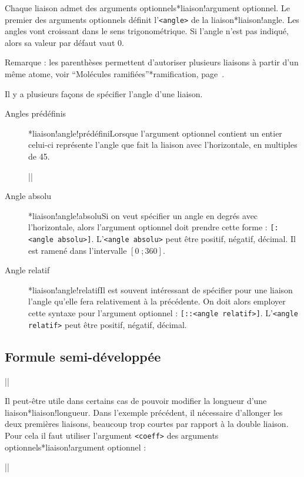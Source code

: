 \documentclass[10pt]{article}
\makeatletter
\newcommand\idx{\@ifstar{\let\print@or@not\@gobble\idx@}{\let\print@or@not\@firstofone\idx@}}
\newcommand\idx@[1]{%
	\ifcat\expandafter\noexpand\@car#1\@nil\relax%
		\expandafter\ifx\@car#1\@nil\protect
			\index{#1}%
			\print@or@not{#1}%
		\else
			\saveexpandmode\expandarg
			\StrSubstitute{\string#1}{\string @}{\@empty\protect\symbol{'100}}[\temp@]%
			\StrGobbleLeft\temp@1[\temp@]%
			\restoreexpandmode
			\expandafter\index\expandafter{\temp@ @\protect\texttt{\protect\textbackslash\temp@}}%
			\print@or@not{\texttt{\string#1}}%
		\fi
	\else
		\index{#1}%
		\print@or@not{#1}%
	\fi
}
\newcommand\make@car@active[2]{%
	\catcode`#1\active
	\begingroup
		\lccode`\~`#1\relax
		\lowercase{\endgroup\def~{#2}}%
}
\newif\if@exstar
\newcommand\exemple{%
	\begingroup
	\parskip\z@
	\@makeother\;\@makeother\!\@makeother\?\@makeother\:%
	\@ifstar{\@exstartrue\exemple@}{\@exstarfalse\exemple@}}
\newcommand\exemple@[2][65]{%
	\medbreak\noindent
	\begingroup
		\let\do\@makeother\dospecials
		\make@car@active\ { {}}%
		\make@car@active\^^M{\par\leavevmode}%
		\make@car@active\,{\leavevmode\kern\z@\string,}%
		\make@car@active\-{\leavevmode\kern\z@\string-}%
		\make@car@active\>{\leavevmode\kern\z@\string>}%
		\make@car@active\<{\leavevmode\kern\z@\string<}%
		\exemple@@{#1}{#2}%
}
\newcommand\exemple@@[3]{%
	\def\@tempa##1#3{\exemple@@@{#1}{#2}{##1}}%
	\@tempa
}
\newcommand\exemple@@@[3]{%
	\xdef\the@code{#3}%
	\endgroup
	\if@exstar
		\begingroup
			\fboxrule0.4pt
			\let\breakboxparindent\z@
			\def\bkvz@bottom{\hrule\@height\fboxrule}%
			\let\bkvz@before@breakbox\relax
			\def\bkvz@set@linewidth{\advance\linewidth\dimexpr-2\fboxrule-2\fboxsep}%
			\def\bkvz@left{\vrule\@width\fboxrule\hskip\fboxsep}%
			\def\bkvz@right{\hskip\fboxsep\vrule\@width\fboxrule}%
			\def\bkvz@top{\hbox to \hsize{%
				\vrule\@width\fboxrule\@height\fboxrule
				\leaders\bkvz@bottom\hfill
				\ECFAugie
				\fboxsep\z@
				\colorbox{black}{\kern0.25em\color{white}\footnotesize\lower0.5ex\hbox{\strut#2}\kern0.25em}%
				\leaders\bkvz@bottom\hfill
				\vrule\@width\fboxrule\@height\fboxrule}}%
			\breakbox
				\kern.5ex\relax
				\ttfamily\footnotesize\the@code\par
				\normalfont
				\kern3pt
				\hrule height0.1pt width\linewidth depth0.1pt
				\vskip5pt
				\rightskip0pt plus 1fill
				\everypar{{\color{lightgray}\rlap{\vrule height0.1pt width\linewidth depth0.1pt}}\hskip0pt plus 1fill}%
				\newlinechar`\^^M\everyeof{\noexpand}\scantokens{#3}\par
			\endbreakbox
		\endgroup
	\else
		\vskip0.5ex
		\boxput*(0,1)
			{\fboxsep\z@
			\hbox{\ECFAugie\colorbox{black}{\leavevmode\kern0.25em{\color{white}\footnotesize\strut#2}\kern0.25em}}%
			}%
			{\fboxsep5pt
			\fbox{%
				$\vcenter{\hsize\dimexpr0.#1\linewidth-\fboxsep-\fboxrule\relax
					\kern5pt\parskip0pt \ttfamily\footnotesize\the@code}%
				\vcenter{\kern5pt\hsize\dimexpr\linewidth-0.#1\linewidth-\fboxsep-\fboxrule\relax
					\everypar{{\color{lightgray}\rlap{\vrule height0.1pt width\dimexpr\linewidth-0.#1\linewidth-\fboxsep-\fboxrule depth0.1pt}}}%
					\footnotesize\newlinechar`\^^M\everyeof{\noexpand}\scantokens{#3}}$%
				}%
			}%
	\fi
	\medbreak
	\endgroup
}
\let\do\@makeother\dospecials
\makeatother
\begin{document}
Chaque liaison admet des arguments optionnels\idx*{liaison!argument optionnel}. Le premier des arguments optionnels définit l'\verb-<angle>- de la liaison\idx*{liaison!angle}. Les angles vont croissant dans le sens trigonométrique. Si l'angle n'est pas indiqué, alors sa valeur par défaut vaut 0\degres.

Remarque : les parenthèses permettent d'autoriser plusieurs liaisons à partir d'un même atome, voir ``Molécules ramifiées''\idx*{ramification}, page~\pageref{molecules.ramifiees}.

Il y a plusieurs façons de spécifier l'angle d'une liaison.
\begin{description}
\item[Angles prédéfinis] \idx*{liaison!angle!prédéfini}Lorsque l'argument optionnel contient un entier celui-ci représente l'angle que fait la liaison avec l'horizontale, en multiples de 45\degres.

\exemple{Angles prédéfinis}||

\item[Angle absolu] \idx*{liaison!angle!absolu}Si on veut spécifier un angle en degrés avec l'horizontale, alors l'argument optionnel doit prendre cette forme : \verb-[:<angle absolu>]-. L'\verb-<angle absolu>- peut être positif, négatif, décimal. Il est ramené dans l'intervalle $[0\;;360]$.
\item[Angle relatif]\idx*{liaison!angle!relatif}Il est souvent intéressant de spécifier pour une liaison l'angle qu'elle fera relativement à la précédente. On doit alors employer cette syntaxe pour l'argument optionnel : \verb-[::<angle relatif>]-. L'\verb-<angle relatif>- peut être positif, négatif, décimal.
\end{description}

\subsection{Formule semi-développée}
\exemple{L'hex-1-ène}||

Il peut-être utile dans certains cas de pouvoir modifier la longueur d'une liaison\idx*{liaison!longueur}. Dans l'exemple précédent, il nécessaire d'allonger les deux premières liaisons, beaucoup trop courtes par rapport à la double liaison. Pour cela il faut utiliser l'argument \verb|<coeff>| des arguments optionnels\idx*{liaison!argument optionnel} :

\exemple{L'hex-1-ène}||
\end{document}
